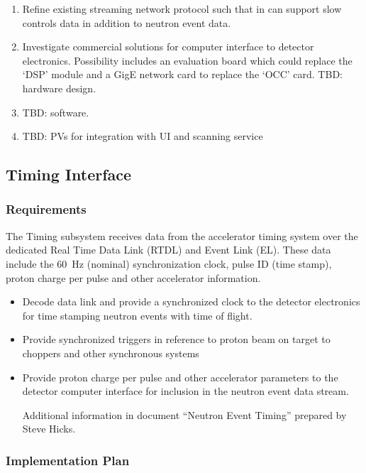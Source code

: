 \begin{enumerate}

\item Refine existing streaming network protocol such that in can support
slow controls data in addition to neutron event data.

\item Investigate commercial solutions for computer interface to detector
electronics. Possibility includes an evaluation board which could replace
the `DSP' module and a GigE network card to replace the `OCC' card.
TBD: hardware design.
\todo{}{%
}

\item TBD: software.

\item TBD: PVs for integration with UI and scanning service

\end{enumerate}

\subsection{Timing Interface}
\subsubsection{Requirements}

The Timing subsystem receives data from the accelerator timing system
over the dedicated Real Time Data Link (RTDL) and Event Link (EL). These
data include the 60~Hz (nominal) synchronization clock, pulse ID (time
stamp), proton charge per pulse and other accelerator information.


\begin{itemize}
\item Decode data link and provide a synchronized clock to the detector
electronics for time stamping neutron events with time of flight.  \item
Provide synchronized triggers in reference to proton beam on target to
choppers and other synchronous systems \item Provide proton charge per
pulse and other accelerator parameters to the detector computer interface
for inclusion in the neutron event data stream.

Additional information in document ``Neutron Event Timing'' prepared by
Steve Hicks.

\end{itemize}

\subsubsection{Implementation Plan}

